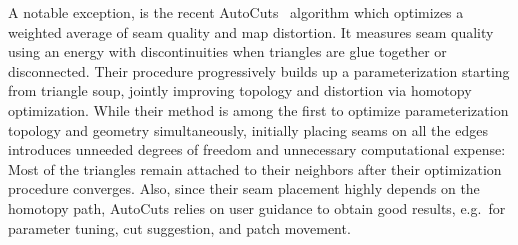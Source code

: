 %

A notable exception, is the recent AutoCuts~\cite{Poranne2017Autocuts} algorithm which optimizes a weighted average of seam quality and map distortion.
It measures seam quality using an energy with discontinuities when triangles are glue together or disconnected.  Their procedure progressively builds up a parameterization starting from triangle soup, jointly improving topology and distortion via homotopy optimization. 
%
While their method is among the first to optimize parameterization topology and geometry simultaneously, 
initially placing seams on all the edges introduces unneeded degrees of freedom and unnecessary computational expense:  Most of the triangles remain attached to their neighbors after their optimization procedure converges. Also, since their seam placement highly depends on the homotopy path, AutoCuts relies on user guidance to obtain good results, e.g.\ for parameter tuning, cut suggestion, and patch movement. %

